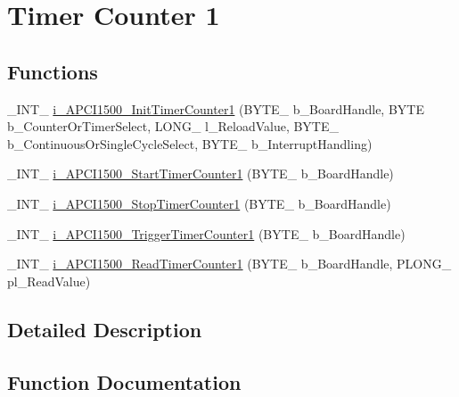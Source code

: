 \hypertarget{group___timer1_cmp_d_l_l}{}\section{Timer Counter 1}
\label{group___timer1_cmp_d_l_l}
\subsection*{Functions}
\begin{DoxyCompactItemize}
\item 
\+\_\+\+I\+N\+T\+\_\+ \mbox{\hyperlink{group___timer1_cmp_d_l_l_ga8c141dafd69ce388a8b4c54dbd17513d}{i\+\_\+\+A\+P\+C\+I1500\+\_\+\+Init\+Timer\+Counter1}} (B\+Y\+T\+E\+\_\+ b\+\_\+\+Board\+Handle, B\+Y\+TE b\+\_\+\+Counter\+Or\+Timer\+Select, L\+O\+N\+G\+\_\+ l\+\_\+\+Reload\+Value, B\+Y\+T\+E\+\_\+ b\+\_\+\+Continuous\+Or\+Single\+Cycle\+Select, B\+Y\+T\+E\+\_\+ b\+\_\+\+Interrupt\+Handling)
\item 
\+\_\+\+I\+N\+T\+\_\+ \mbox{\hyperlink{group___timer1_cmp_d_l_l_gace6eac0f76df7c817071c515a98bc53b}{i\+\_\+\+A\+P\+C\+I1500\+\_\+\+Start\+Timer\+Counter1}} (B\+Y\+T\+E\+\_\+ b\+\_\+\+Board\+Handle)
\item 
\+\_\+\+I\+N\+T\+\_\+ \mbox{\hyperlink{group___timer1_cmp_d_l_l_ga476e14ea7ac6a63a13bf6fa7af61027a}{i\+\_\+\+A\+P\+C\+I1500\+\_\+\+Stop\+Timer\+Counter1}} (B\+Y\+T\+E\+\_\+ b\+\_\+\+Board\+Handle)
\item 
\+\_\+\+I\+N\+T\+\_\+ \mbox{\hyperlink{group___timer1_cmp_d_l_l_gac31afd4c239c22ea472c5fc44b01f61f}{i\+\_\+\+A\+P\+C\+I1500\+\_\+\+Trigger\+Timer\+Counter1}} (B\+Y\+T\+E\+\_\+ b\+\_\+\+Board\+Handle)
\item 
\+\_\+\+I\+N\+T\+\_\+ \mbox{\hyperlink{group___timer1_cmp_d_l_l_gad386a8c04297a5b04eab65b751d3e4e6}{i\+\_\+\+A\+P\+C\+I1500\+\_\+\+Read\+Timer\+Counter1}} (B\+Y\+T\+E\+\_\+ b\+\_\+\+Board\+Handle, P\+L\+O\+N\+G\+\_\+ pl\+\_\+\+Read\+Value)
\end{DoxyCompactItemize}


\subsection{Detailed Description}


\subsection{Function Documentation}
\mbox{\label{group___timer1_cmp_d_l_l_ga8c141dafd69ce388a8b4c54dbd17513d}} 
